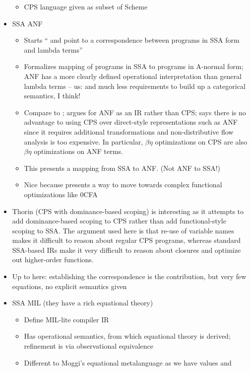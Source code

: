\documentclass[acmsmall,screen,review]{acmart}
\begin{document}
\begin{itemize}
\begin{itemize}
    \item CPS language given as subset of Scheme
  \end{itemize}
  \item SSA ANF \citet{chakravarty-functional-ssa-2003}
  \begin{itemize}
    \item Starts ``\citet{kelsey-95-cps} and \citet{appel-ssa} point to a correspondence between
    programs in SSA form and lambda terms''
    \item Formalizes mapping of programs in SSA to programs in A-normal form; ANF has a more clearly
    defined operational interpretation than general lambda terms -- us: and much less requirements
    to build up a categorical semantics, I think!
    \item Compare to \citet{kelsey-95-cps}; \citet{flanagan-93-anf} argues for ANF as an IR rather
    than CPS; says there is no advantage to using CPS over direct-style representations such as ANF
    since it requires additional transformations and non-distributive flow analysis is too
    expensive. In particular, $\beta\eta$ optimizations on CPS are also $\beta\eta$ optimizations on
    ANF terms.
    \item This presents a mapping from SSA to ANF. (Not ANF to SSA!)
    \item Nice because presents a way to move towards complex functional optimizations like 0CFA
  \end{itemize}
  \item Thorin (CPS with dominance-based scoping) \citet{thorin-12} is interesting as it attempts to
  add dominance-based scoping to CPS rather than add functional-style scoping to SSA. The argument
  used here is that re-use of variable names makes it difficult to reason about regular CPS
  programs, whereas standard SSA-based IRs make it very difficult to reason about closures and
  optimize out higher-order functions.
  \item Up to here: establishing the correspondence is the contribution, but very few equations,
  no explicit semantics given
  \item SSA MIL \citet{benton-kennedy-99} (they have a rich equational theory)
  \begin{itemize}
    \item Define MIL-lite compiler IR
    \item Has operational semantics, from which equational theory is derived; refinement is via
    observational equivalence
    \item Different to Moggi's equational metalanguage \citet{moggi-91-monad} as we have values and

\end{itemize}
\end{itemize}
\end{document}
